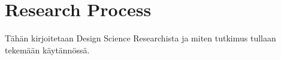 \section{Research Process}
Tähän kirjoitetaan Design Science Researchista ja miten tutkimus tullaan tekemään käytännössä.
